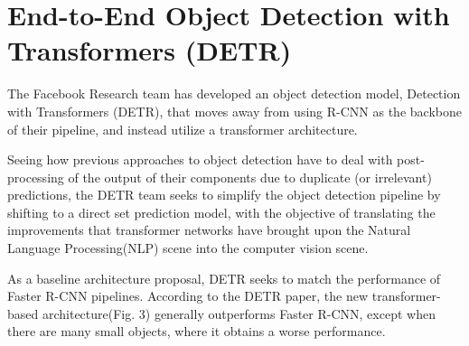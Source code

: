\documentclass[12pt,a4paper,twocolumn,twoside]{article}
\begin{document}
\section{End-to-End Object Detection with Transformers (DETR)}
The Facebook Research team has developed an object detection model, Detection with Transformers (DETR)\cite{carion_massa_synnaeve_usunier_kirillov_zagoruyko_2020}, that moves away from using R-CNN as the backbone of their pipeline, and instead utilize a transformer architecture. 

Seeing how previous approaches to object detection have to deal with post-processing of the output of their components due to duplicate (or irrelevant) predictions, the DETR team seeks to simplify the object detection pipeline by shifting to a direct set prediction model, with the objective of translating the improvements that transformer networks have brought upon the Natural Language Processing(NLP) scene into the computer vision scene.

As a baseline architecture proposal, DETR seeks to match the performance of Faster R-CNN pipelines. According to the DETR paper, the new transformer-based architecture(Fig. 3) generally outperforms Faster R-CNN, except when there are many small objects, where it obtains a worse performance.
\printbibliography
\end{document}
